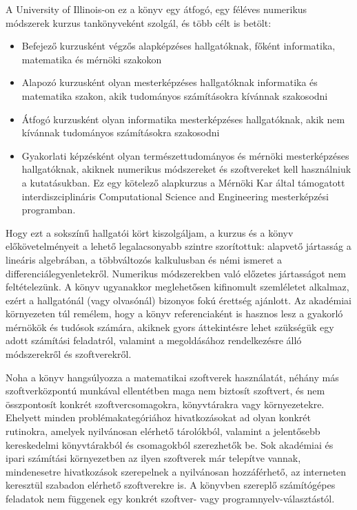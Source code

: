 \documentclass[
  magyar,
  11pt]{article}
\providecommand{\tightlist}{%
  \setlength{\itemsep}{0pt}\setlength{\parskip}{0pt}}
\begin{document}
A University of Illinois-on ez a könyv egy átfogó, egy féléves numerikus
módszerek kurzus tankönyveként szolgál, és több célt is betölt:

\begin{itemize}
\tightlist
\item
  Befejező kurzusként végzős alapképzéses hallgatóknak, főként
  informatika, matematika és mérnöki szakokon
\item
  Alapozó kurzusként olyan mesterképzéses hallgatóknak informatika és
  matematika szakon, akik tudományos számításokra kívánnak szakosodni
\item
  Átfogó kurzusként olyan informatika mesterképzéses hallgatóknak, akik
  nem kívánnak tudományos számításokra szakosodni
\item
  Gyakorlati képzésként olyan természettudományos és mérnöki
  mesterképzéses hallgatóknak, akiknek numerikus módszereket és
  szoftvereket kell használniuk a kutatásukban. Ez egy kötelező
  alapkurzus a Mérnöki Kar által támogatott interdiszciplináris
  Computational Science and Engineering mesterképzési programban.
\end{itemize}

Hogy ezt a sokszínű hallgatói kört kiszolgáljam, a kurzus és a könyv
előkövetelményeit a lehető legalacsonyabb szintre szorítottuk: alapvető
jártasság a lineáris algebrában, a többváltozós kalkulusban és némi
ismeret a differenciálegyenletekről. Numerikus módszerekben való
előzetes jártasságot nem feltételezünk. A könyv ugyanakkor meglehetősen
kifinomult szemléletet alkalmaz, ezért a hallgatónál (vagy olvasónál)
bizonyos fokú érettség ajánlott. Az akadémiai környezeten túl remélem,
hogy a könyv referenciaként is hasznos lesz a gyakorló mérnökök és
tudósok számára, akiknek gyors áttekintésre lehet szükségük egy adott
számítási feladatról, valamint a megoldásához rendelkezésre álló
módszerekről és szoftverekről.

Noha a könyv hangsúlyozza a matematikai szoftverek használatát, néhány
más szoftverközpontú munkával ellentétben maga nem biztosít szoftvert,
és nem összpontosít konkrét szoftvercsomagokra, könyvtárakra vagy
környezetekre. Ehelyett minden problémakategóriához hivatkozásokat ad
olyan konkrét rutinokra, amelyek nyilvánosan elérhető tárolókból,
valamint a jelentősebb kereskedelmi könyvtárakból és csomagokból
szerezhetők be. Sok akadémiai és ipari számítási környezetben az ilyen
szoftverek már telepítve vannak, mindenesetre hivatkozások szerepelnek a
nyilvánosan hozzáférhető, az interneten keresztül szabadon elérhető
szoftverekre is. A könyvben szereplő számítógépes feladatok nem függenek
egy konkrét szoftver- vagy programnyelv-választástól.
\end{document}
